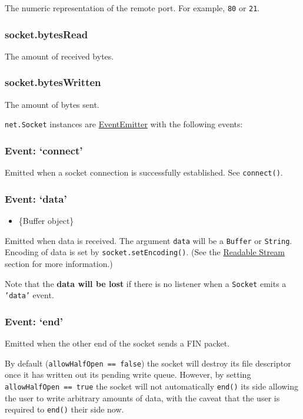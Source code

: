 The numeric representation of the remote port. For example, \texttt{80}
or \texttt{21}.

\subsubsection{socket.bytesRead}

The amount of received bytes.

\subsubsection{socket.bytesWritten}

The amount of bytes sent.

\texttt{net.Socket} instances are
\href{events.html\#events\_class\_events\_eventemitter}{EventEmitter}
with the following events:

\subsubsection{Event: `connect'}

Emitted when a socket connection is successfully established. See
\texttt{connect()}.

\subsubsection{Event: `data'}

\begin{itemize}
\item
  \{Buffer object\}
\end{itemize}

Emitted when data is received. The argument \texttt{data} will be a
\texttt{Buffer} or \texttt{String}. Encoding of data is set by
\texttt{socket.setEncoding()}. (See the
\href{stream.html\#stream\_readable\_stream}{Readable Stream} section
for more information.)

Note that the \textbf{data will be lost} if there is no listener when a
\texttt{Socket} emits a \texttt{'data'} event.

\subsubsection{Event: `end'}

Emitted when the other end of the socket sends a FIN packet.

By default (\texttt{allowHalfOpen == false}) the socket will destroy its
file descriptor once it has written out its pending write queue.
However, by setting \texttt{allowHalfOpen == true} the socket will not
automatically \texttt{end()} its side allowing the user to write
arbitrary amounts of data, with the caveat that the user is required to
\texttt{end()} their side now.

